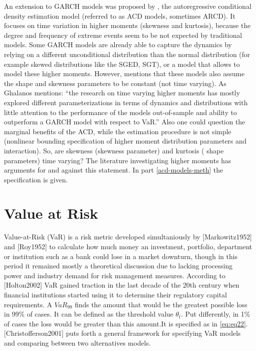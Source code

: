\documentclass[a4paper, twoside]{templates/ociamthesis}
\begin{document}
An extension to GARCH models was proposed by \textcite{hansen1994}, the autoregressive conditional density estimation model (referred to as ACD models, sometimes ARCD). It focuses on time variation in higher moments (skewness and kurtosis), because the degree and frequency of extreme events seem to be not expected by traditional models. Some GARCH models are already able to capture the dynamics by relying on a different unconditional distribution than the normal distribution (for example skewed distributions like the SGED, SGT), or a model that allows to model these higher moments. However, \textcite{ghalanos2016} mentions that these models also assume the shape and skewness parameters to be constant (not time varying). As Ghalanos mentions: ``the research on time varying higher moments has mostly explored different parameterizations in terms of dynamics and distributions with little attention to the performance of the models out-of-sample and ability to outperform a GARCH model with respect to VaR.'' Also one could question the marginal benefits of the ACD, while the estimation procedure is not simple (nonlinear bounding specification of higher moment distribution parameters and interaction). So, are skewness (skewness parameter) and kurtosis ( shape parameters) time varying? The literature investigating higher moments has arguments for and against this statement. In part \ref{acd-models-meth} the specification is given.

\newpage

\hypertarget{value-at-risk}{%
\section{Value at Risk}\label{value-at-risk}}

Value-at-Risk (VaR) is a risk metric developed simultaniously by {[}Markowitz1952{]} and {[}Roy1952{]} to calculate how much money an investment, portfolio, department or institution such as a bank could lose in a market downturn, though in this period it remained mostly a theoretical discussion due to lacking processing power and industry demand for risk management measures. According to {[}Holton2002{]} VaR gained traction in the last decade of the 20th century when financial institutions started using it to determine their regulatory capital requirements. A \(VaR_{99}\) finds the amount that would be the greatest possible loss in 99\% of cases. It can be defined as the threshold value \(\theta_t\). Put differently, in 1\% of cases the loss would be greater than this amount.It is specified as in \eqref{eq:eq22}. {[}Christofferson2001{]} puts forth a general framework for specifying VaR models and comparing between two alternatives models.
\end{document}
